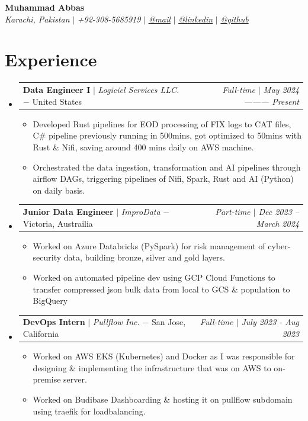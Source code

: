 \documentclass[letterpaper,10pt]{article}
\makeatletter
\newcommand{\subheadingtitlevspace}{
\vspace{-3pt}
}
\newcommand{\resumeItem}[1]{
  \item{
    {#1 \vspace{-4pt}}
  }
}
\newcommand{\titleItem}[1]{
  \textbf{#1}
}
\newcommand{\resumeProjectHeading}[2]{
    \item
    \begin{tabular*}{0.97\textwidth}{l@{\extracolsep{\fill}}r}
      #1 & \textit{ #2} \\
    \end{tabular*}\vspace{-9pt}
}
\newcommand{\resumeSubHeadingListStart}{\subheadingtitlevspace\begin{itemize}[leftmargin=0.15in, label={}]}
\newcommand{\resumeSubHeadingListEnd}{\end{itemize}}
\newcommand{\resumeItemListStart}{
\begin{itemize}}
\newcommand{\resumeItemListEnd}{
\vspace{2pt}
\end{itemize}\vspace{-8pt}}
\makeatother
\begin{document}
\begin{flushleft}
	\textbf{\large Muhammad Abbas} \\
	\textit{Karachi, Pakistan} $|$
	\textit{+92-308-5685919} $|$
	\href{mailto:abbastaqvi81@gmail.com}{{\textit{@mail}}} $|$
	\href{https://linkedin.com/in/abbastaqvi}{{\textit{@linkedin}}} $|$
	\href{https://github.com/smabbasht}{{\textit{@github}}}
	\vspace{-8pt}
\end{flushleft}

\section{Experience}
\resumeSubHeadingListStart
\resumeProjectHeading
{\titleItem{{Data Engineer I}} $|$ \emph{Logiciel Services LLC.} $-$ \small{United States}}{\small{Full-time} $|$ May 2024 --------- Present}
\resumeItemListStart
\resumeItem{Developed Rust pipelines for EOD processing of FIX logs to CAT
files, C\# pipeline previously running in 500mins, got optimized to 50mins with
Rust \& Nifi, saving around 400 mins daily on AWS machine.} 
\resumeItem{Orchestrated the data ingestion, transformation and AI pipelines
through airflow DAGs, triggering pipelines of Nifi, Spark, Rust and AI (Python)
on daily basis.}
\resumeItemListEnd
\resumeSubHeadingListEnd


\resumeSubHeadingListStart
\resumeProjectHeading
{\titleItem{{Junior Data Engineer}} $|$ \emph{ImproData} $-$ \small{Victoria, Austrailia}}{ \small{Part-time} $|$ Dec 2023 -- March 2024 }
\resumeItemListStart
\resumeItem{Worked on Azure Databricks (PySpark) for risk management of
cyber-security data, building bronze, silver and gold layers.}
\resumeItem{Worked on automated pipeline dev using GCP Cloud Functions to
transfer compressed json bulk data from local to GCS \& population to BigQuery}
\resumeItemListEnd
\resumeSubHeadingListEnd

\resumeSubHeadingListStart
\resumeProjectHeading
{\titleItem{{DevOps Intern}} $|$ \emph{Pullflow Inc.} $-$ \small{San Jose, California}}{\small{Full-time} $|$ July 2023 - Aug 2023}
\resumeItemListStart
\resumeItem{Worked on AWS EKS (Kubernetes) and Docker as I was responsible for
designing \& implementing the infrastructure that was on AWS to on-premise
server.}
\resumeItem{Worked on Budibase Dashboarding \& hosting it on
pullflow subdomain using traefik for loadbalancing.}
\resumeItemListEnd
\resumeSubHeadingListEnd
\end{document}
